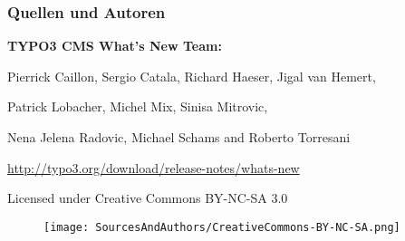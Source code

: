 \begin{frame}[fragile]
	\frametitle{Quellen und Autoren}

	\vspace{-0.6cm}

	\centerline{\textbf{TYPO3 CMS What's New Team:}}

	\begin{center}
		\centerline{Pierrick Caillon, Sergio Catala, Richard Haeser, Jigal van Hemert,}
		\centerline{Patrick Lobacher, Michel Mix, Sinisa Mitrovic,}
		\centerline{Nena Jelena Radovic, Michael Schams and Roberto Torresani}
	\end{center}

	\vspace{0.4cm}

	\smaller\begin{center}\url{http://typo3.org/download/release-notes/whats-new}\end{center}\normalsize

	\vspace{1cm}

	\smaller\begin{center}Licensed under Creative Commons BY-NC-SA 3.0\end{center}\normalsize
	\begin{figure}\vspace*{-0.4cm}
		\texttt{[image: SourcesAndAuthors/CreativeCommons-BY-NC-SA.png]}
	\end{figure}

\end{frame}

